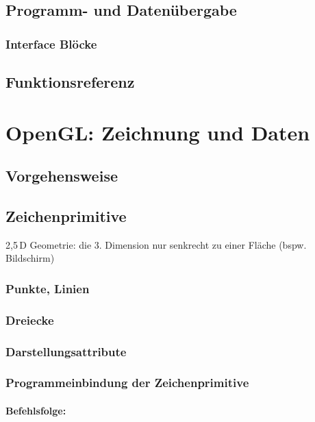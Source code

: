 \section{Programm- und Datenübergabe}
\subsection{Interface Blöcke}

\section{Funktionsreferenz}

\chapter{OpenGL: Zeichnung und Daten}

\section{Vorgehensweise}

\section{Zeichenprimitive}

2,5\,D Geometrie: die 3. Dimension nur senkrecht zu einer Fläche (bspw. Bildschirm)

\subsection{Punkte, Linien}

\subsection{Dreiecke}

\subsection{Darstellungsattribute}

\subsection{Programmeinbindung der Zeichenprimitive}
\subsubsection*{Befehlsfolge:}

